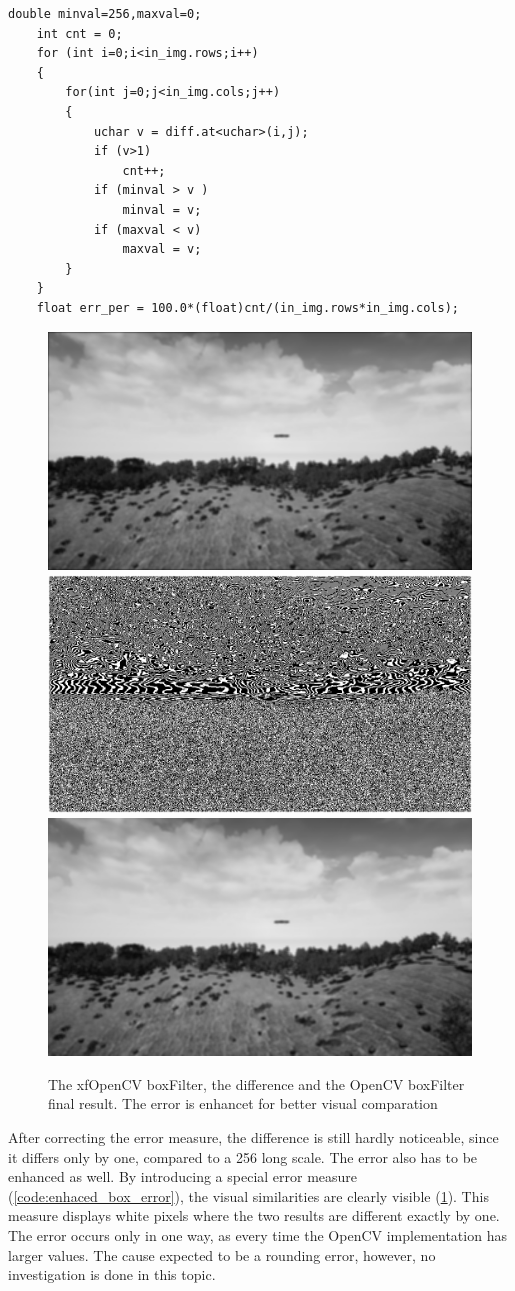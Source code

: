 \begin{lstlisting}
double minval=256,maxval=0;
	int cnt = 0;
	for (int i=0;i<in_img.rows;i++)
	{
		for(int j=0;j<in_img.cols;j++)
		{
			uchar v = diff.at<uchar>(i,j);
			if (v>1)
				cnt++;
			if (minval > v )
				minval = v;
			if (maxval < v)
				maxval = v;
		}
	}
	float err_per = 100.0*(float)cnt/(in_img.rows*in_img.cols);
\end{lstlisting}

\begin{figure}[b]
    \centering
    \includegraphics[width=.32\linewidth]{images/box_filter/HLS_img.jpg}
    \includegraphics[width=.32\linewidth]{images/box_filter/diff_img.jpg}
    \includegraphics[width=.32\linewidth]{images/box_filter/OCV_img.jpg}
    \caption{The xfOpenCV boxFilter, the difference and the OpenCV boxFilter final result. The error is enhancet for better visual comparation}
    \label{fig:box_error}
\end{figure}

After correcting the error measure, the difference is still hardly noticeable, since it differs only by one, compared to a 256 long scale.
The error also has to be enhanced as well.
By introducing a special error measure (\cref{code:enhaced_box_error}), the visual similarities are clearly visible (\cref{fig:box_error}).
This measure displays white pixels where the two results are different exactly by one.
The error occurs only in one way, as every time the OpenCV implementation has larger values.
The cause expected to be a rounding error, however, no investigation is done in this topic.

